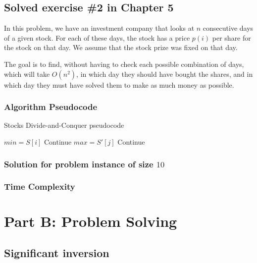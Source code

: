 \documentclass{article}
\begin{document}
\subsection*{Solved exercise \#2 in Chapter 5}

In this problem, we have an investment company that looks at $n$ consecutive days of a given stock. For each of these days, the stock has a price $p(i)$ per share for the stock on that day. We assume that the stock prize was fixed on that day.

The goal is to find, without having to check each possible combination of days, which will take $O(n^2)$, in which day they should have bought the shares, and in which day they must have solved them to make as much money as possible.

\subsubsection*{Algorithm Pseudocode}

\begin{algorithm}[H]
\caption{Stocks Divide-and-Conquer pseudocode}
\begin{algorithmic}[1]
 \EndIf
 \Else{}
 \EndIf
\EndFunction


  \State $min = S[i]$
 \EndIf
 \Else{}
  \State Continue
 \EndIf
\EndFor
{}
  \State $max = S'[j]$
 \EndIf
 \Else{}
  \State Continue
 \EndIf
\EndFor
\end{algorithmic}
\end{algorithm}

\subsubsection*{Solution for problem instance of size $10$}

\subsubsection*{Time Complexity}

\section*{Part B: Problem Solving}

\subsection*{Significant inversion}
\end{document}
